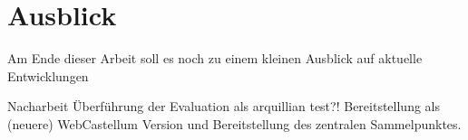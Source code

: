 \section{Ausblick}

Am Ende dieser Arbeit soll es noch zu einem kleinen Ausblick auf aktuelle Entwicklungen


\begin{neu}
  Nacharbeit Überführung der Evaluation als arquillian test?!
  Bereitstellung als (neuere) WebCastellum Version und Bereitstellung des zentralen Sammelpunktes.
\end{neu}

